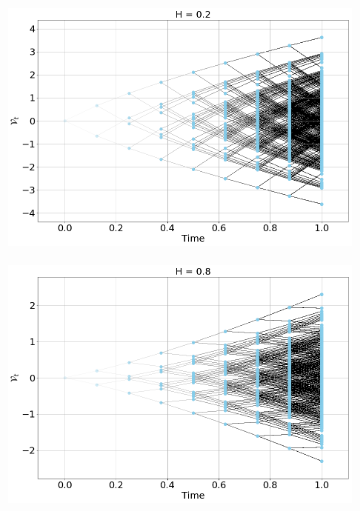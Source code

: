 \documentclass[12pt]{article}
\numberwithin{equation}{section}
\begin{document}
\begin{figure}[htb!]
\begin{center}
  \begin{subfigure}{0.5\textwidth}
    \centering
    \includegraphics[width=1.0\textwidth]{vol_tree_H02}
    \label{fig:1}
  \end{subfigure}%
  \begin{subfigure}{0.5\textwidth}
    \centering
    \includegraphics[width=1.0\textwidth]{vol_tree_H08}
    \label{fig:2}
  \end{subfigure}\\
  

\end{center}
\end{figure}
\end{document}
